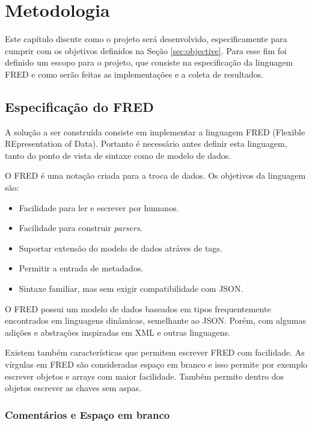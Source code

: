 \chapter[Metodologia]{Metodologia}

Este capítulo discute como o projeto será desenvolvido, especificamente
para cumprir com os objetivos definidos na Seção \ref{sec:objective}. Para esse fim
foi definido um escopo para o projeto, que consiste na especificação da linguagem FRED e 
como serão feitas as implementações e a coleta de resultados.

\section{Especificação do FRED}
\label{sec:solution}

A solução a ser construída consiste em implementar a linguagem FRED (Flexible REpresentation of Data).
Portanto é necessário antes definir esta linguagem, tanto do ponto de vista de sintaxe como de modelo de dados.

O FRED é uma notação criada para a troca de dados. Os
objetivos da linguagem são:

\begin{itemize}
    \item Facilidade para ler e escrever por humanos.
    \item Facilidade para construir \textit{parsers}.
    \item Suportar extensão do modelo de dados atráves de tags.
    \item Permitir a entrada de metadados.
    \item Sintaxe familiar, mas sem exigir compatibilidade com JSON.
\end{itemize}

O FRED possui um modelo de dados baseados em tipos frequentemente encontrados em linguagens
dinâmicas, semelhante ao JSON. Porém, com algumas adições e abstrações 
inspiradas em XML e outras linguagens.

Existem também características que permitem escrever FRED com facilidade. As vírgulas
em FRED são consideradas espaço em branco e isso permite por exemplo escrever objetos
e arrays com maior facilidade. Também permite dentro dos objetos escrever as chaves sem
aspas.

\subsection{Comentários e Espaço em branco}

